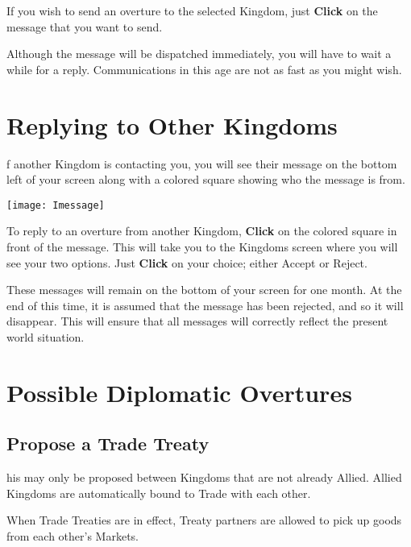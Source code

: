 If you wish to send an overture to the selected Kingdom, just \textbf{Click} on the message that you want to send.

Although the message will be dispatched immediately, you will have to wait a while for a reply. Communications in this age are not as fast as you might wish.

\section{\textsf{Replying to Other Kingdoms}}


f another Kingdom is contacting you, you will see their message on the bottom left of your screen along with a colored square showing who the message is from.

\begin{center}
    \texttt{[image: Imessage]} %
\end{center}

To reply to an overture from another Kingdom, \textbf{Click} on the colored square in front of the message. This will take you to the Kingdoms screen where you will see your two options. Just \textbf{Click} on your choice; either Accept or Reject.

These messages will remain on the bottom of your screen for one month. At the end of this time, it is assumed that the message has been rejected, and so it will disappear. This will ensure that all messages will correctly reflect the present world situation.

\section{\textsf{Possible Diplomatic Overtures}}


\subsection{\textsf{Propose a Trade Treaty}}


his may only be proposed between Kingdoms that are not already Allied. Allied Kingdoms are automatically bound to Trade with each other.

When Trade Treaties are in effect, Treaty partners are allowed to pick up goods from each other’s Markets.


